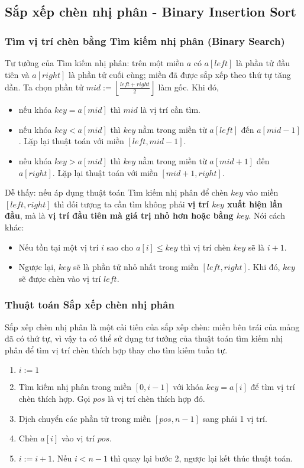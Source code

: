 \documentclass[]{article}
\begin{document}
\subsection{Sắp xếp chèn nhị phân - Binary Insertion Sort}
\label{subsec:bininsertsort}
\subsubsection{Tìm vị trí chèn bằng Tìm kiếm nhị phân (Binary Search)}
Tư tưởng của Tìm kiếm nhị phân: trên một miền $a$ có $a[left]$ là phần tử đầu tiên và $a[right]$ là phần tử cuối cùng; miền đã được sắp xếp theo thứ tự tăng dần. Ta chọn phần tử $\displaystyle mid := \left\lfloor\frac{left + right}{2}\right\rfloor$ làm gốc. Khi đó,
\begin{itemize}
\item nếu khóa $key = a[mid]$ thì $mid$ là vị trí cần tìm.
\item nếu khóa $key < a[mid]$ thì $key$ nằm trong miền từ $a[left]$ đến $a[mid - 1]$. Lặp lại thuật toán với miền $[left, mid - 1]$.
\item nếu khóa $key > a[mid]$ thì $key$ nằm trong miền từ $a[mid + 1]$ đến $a[right]$. Lặp lại thuật toán với miền $[mid + 1, right]$.
\end{itemize}
Dễ thấy: nếu áp dụng thuật toán Tìm kiếm nhị phân để chèn $key$ vào miền $[left, right]$ thì đối tượng ta cần tìm không phải \textbf{vị trí $key$ xuất hiện lần đầu}, mà là \textbf{vị trí đầu tiên mà giá trị nhỏ hơn hoặc bằng $key$}. Nói cách khác:
\begin{itemize}
\item Nếu tồn tại một vị trí $i$ sao cho $a[i] \leq key$ thì vị trí chèn $key$ sẽ là $i + 1$.
\item Ngược lại, $key$ sẽ là phần tử nhỏ nhất trong miền $[left, right]$. Khi đó, $key$ sẽ được chèn vào vị trí $left$.
\end{itemize}

\subsubsection{Thuật toán Sắp xếp chèn nhị phân}
Sắp xếp chèn nhị phân là một cải tiến của sắp xếp chèn: miền bên trái của mảng đã có thứ tự, vì vậy ta có thể sử dụng tư tưởng của thuật toán tìm kiếm nhị phân để tìm vị trí chèn thích hợp thay cho tìm kiếm tuần tự.
\begin{enumerate}
\item $i := 1$
\item Tìm kiếm nhị phân trong miền $[0, i - 1]$ với khóa $key = a[i]$ để tìm vị trí chèn thích hợp. Gọi $pos$ là vị trí chèn thích hợp đó.
\item Dịch chuyển các phần tử trong miền $[pos, n - 1]$ sang phải 1 vị trí.
\item Chèn $a[i]$ vào vị trí $pos$.
\item $i := i + 1$. Nếu $i < n - 1$ thì quay lại bước 2, ngược lại kết thúc thuật toán.
\end{enumerate}
\end{document}
